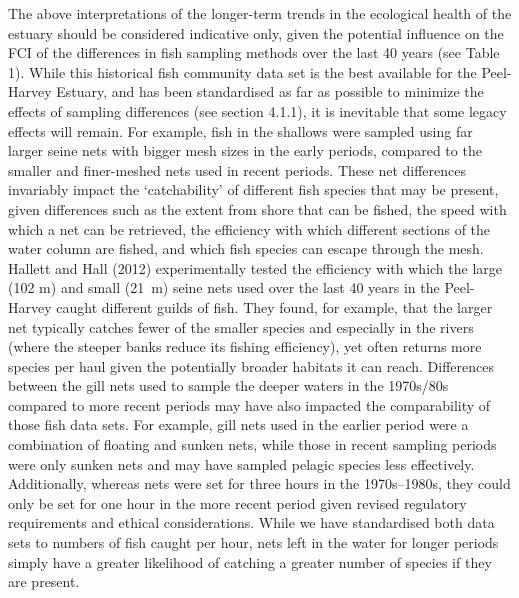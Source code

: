 \documentclass[
]{book}
\begin{document}
The above interpretations of the longer-term trends in the ecological health of the estuary should be considered indicative only, given the potential influence on the FCI of the differences in fish sampling methods over the last 40 years (see Table 1). While this historical fish community data set is the best available for the Peel-Harvey Estuary, and has been standardised as far as possible to minimize the effects of sampling differences (see section 4.1.1), it is inevitable that some legacy effects will remain. For example, fish in the shallows were sampled using far larger seine nets with bigger mesh sizes in the early periods, compared to the smaller and finer-meshed nets used in recent periods. These net differences invariably impact the `catchability' of different fish species that may be present, given differences such as the extent from shore that can be fished, the speed with which a net can be retrieved, the efficiency with which different sections of the water column are fished, and which fish species can escape through the mesh. Hallett and Hall (2012) experimentally tested the efficiency with which the large (102 m) and small (21~m) seine nets used over the last 40 years in the Peel-Harvey caught different guilds of fish. They found, for example, that the larger net typically catches fewer of the smaller species and especially in the rivers (where the steeper banks reduce its fishing efficiency), yet often returns more species per haul given the potentially broader habitats it can reach. Differences between the gill nets used to sample the deeper waters in the 1970s/80s compared to more recent periods may have also impacted the comparability of those fish data sets. For example, gill nets used in the earlier period were a combination of floating and sunken nets, while those in recent sampling periods were only sunken nets and may have sampled pelagic species less effectively. Additionally, whereas nets were set for three hours in the 1970s--1980s, they could only be set for one hour in the more recent period given revised regulatory requirements and ethical considerations. While we have standardised both data sets to numbers of fish caught per hour, nets left in the water for longer periods simply have a greater likelihood of catching a greater number of species if they are present.
\end{document}
